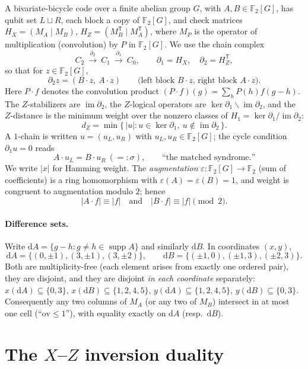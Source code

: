 \documentclass[11pt]{article}
\newcommand{\F}[1]{\mathbb{F}_{#1}}
\newcommand{\wt}[1]{\lvert #1\rvert}
\DeclareMathOperator{\img}{im}
\DeclareMathOperator{\supp}{supp}
\newcommand{\aug}{\varepsilon}
\theoremstyle{plain}
\theoremstyle{definition}
\theoremstyle{remark}
\begin{document}
A bivariate-bicycle code over a finite abelian group $G$, with $A,B\in\F2[G]$, has qubit
set $L\sqcup R$, each block a copy of $\F2[G]$, and check matrices
$H_X=(M_A\mid M_B)$, $H_Z=(M_B^{\mathsf T}\mid M_A^{\mathsf T})$, where $M_P$ is the
operator of multiplication (convolution) by $P$ in $\F2[G]$. We use the chain complex
\[
  C_2\ \xrightarrow{\ \partial_2\ }\ C_1\ \xrightarrow{\ \partial_1\ }\ C_0,
  \qquad \partial_1=H_X,\quad \partial_2=H_Z^{\mathsf T},
\]
so that for $z\in\F2[G]$,
\[
  \partial_2 z=(B\cdot z,\ A\cdot z)\qquad\text{(left block $B\cdot z$, right block $A\cdot z$)} .
\]
Here $P\cdot f$ denotes the convolution product $(P\cdot f)(g)=\sum_{h}P(h)f(g-h)$. The
$Z$-stabilizers are $\img\partial_2$, the $Z$-logical operators are
$\ker\partial_1\smallsetminus\img\partial_2$, and the $Z$-distance is the minimum weight
over the nonzero classes of $H_1=\ker\partial_1/\img\partial_2$:
\[
  d_Z=\min\{\,\wt{u} : u\in\ker\partial_1,\ u\notin\img\partial_2\,\}.
\]
A $1$-chain is written $u=(u_L,u_R)$ with $u_L,u_R\in\F2[G]$; the cycle condition
$\partial_1 u=0$ reads
\[
  A\cdot u_L=B\cdot u_R\ (=:\sigma),\qquad\text{``the matched syndrome.''}
\]
We write $\wt{x}$ for Hamming weight. The \emph{augmentation}
$\aug\colon\F2[G]\to\F2$ (sum of coefficients) is a ring homomorphism with
$\aug(A)=\aug(B)=1$, and weight is congruent to augmentation modulo $2$; hence
\begin{equation}\label{eq:PAR}
  \wt{A\cdot f}\equiv\wt{f}\quad\text{and}\quad \wt{B\cdot f}\equiv\wt{f}\pmod 2.\tag{PAR}
\end{equation}

\paragraph{Difference sets.}
Write $\mathrm d A=\{g-h: g\ne h\in\supp A\}$ and similarly $\mathrm d B$. In coordinates
$(x,y)$,
\[
  \mathrm d A=\{(0,\pm1),(3,\pm1),(3,\pm2)\},\qquad
  \mathrm d B=\{(\pm1,0),(\pm1,3),(\pm2,3)\}.
\]
Both are multiplicity-free (each element arises from exactly one ordered pair), they are
disjoint, and they are disjoint \emph{in each coordinate} separately:
$x(\mathrm dA)\subseteq\{0,3\}$, $x(\mathrm dB)\subseteq\{1,2,4,5\}$,
$y(\mathrm dA)\subseteq\{1,2,4,5\}$, $y(\mathrm dB)\subseteq\{0,3\}$. Consequently any two
columns of $M_A$ (or any two of $M_B$) intersect in at most one cell (``$\mathrm{ov}\le1$''),
with equality exactly on $\mathrm dA$ (resp.\ $\mathrm dB$).

\section{The \texorpdfstring{$X$--$Z$}{X-Z} inversion duality}\label{sec:duality}
\end{document}
